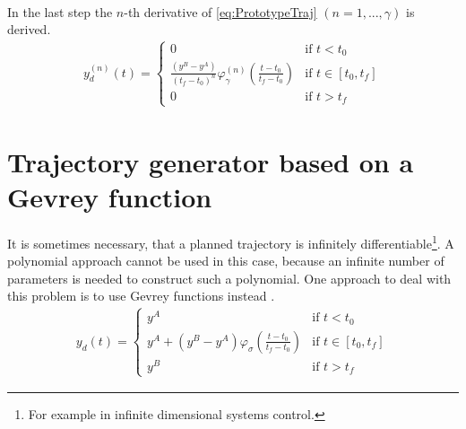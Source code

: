 \documentclass[a4paper,12pt,headinclude=true,headsepline,parskip=half,DIV=12]{scrartcl}
\begin{document}
\begin{appendices}
\begin{align}
  \end{align}
  In the last step the $n$-th derivative of \autoref{eq:PrototypeTraj} $(n=1,...,\gamma)$ is derived.
  \begin{align}
    y_d^{(n)}(t) = \begin{cases} 0                                                                                   & \textrm{if } t<t_0            \\
              \frac{(y^B-y^A)}{(t_f-t_0)^n}\varphi_\gamma^{(n)}\left(\frac{t-t_0}{t_f-t_0}\right) & \textrm{if } t \in [t_0, t_f] \\
              0                                                                                   & \textrm{if } t>t_f\end{cases}
  \end{align}




  \section{Trajectory generator based on a Gevrey function} \label{app:Gevery}
  It is sometimes necessary, that a planned trajectory is infinitely differentiable\footnote{For example in infinite dimensional systems control.}. A polynomial approach cannot be used in this case, because an infinite number of parameters is needed to construct such a polynomial. One approach to deal with this problem is to use Gevrey functions instead \cite{Rud03}.
  \begin{align*}
    y_d(t) = \begin{cases} y^A                                                             & \textrm{if } t<t_0            \\
              y^A + (y^B-y^A)\varphi_\sigma\left(\frac{t-t_0}{t_f-t_0}\right) & \textrm{if } t \in [t_0, t_f] \\
              y^B                                                             & \textrm{if } t>t_f\end{cases}
  \end{align*}
  
  
  

\end{appendices}
\end{document}
